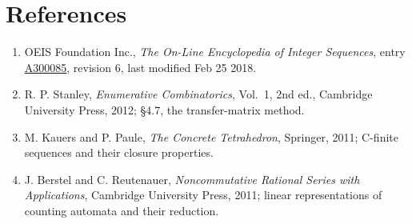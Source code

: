 \documentclass[11pt]{article}
\theoremstyle{definition}
\begin{document}
\section{References}

\begin{enumerate}

\item OEIS Foundation Inc., \emph{The On-Line Encyclopedia of Integer Sequences}, entry \href{https://oeis.org/A300085}{A300085}, revision 6, last modified Feb 25 2018.

\item R. P. Stanley, \emph{Enumerative Combinatorics}, Vol.~1, 2nd ed., Cambridge University Press, 2012; \S4.7, the transfer-matrix method.

\item M. Kauers and P. Paule, \emph{The Concrete Tetrahedron}, Springer, 2011; C-finite sequences and their closure properties.

\item J. Berstel and C. Reutenauer, \emph{Noncommutative Rational Series with Applications}, Cambridge University Press, 2011; linear representations of counting automata and their reduction.

\end{enumerate}
\end{document}

